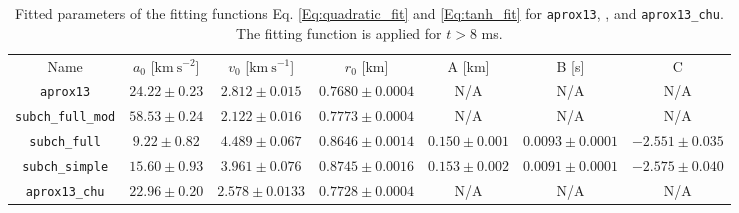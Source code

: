 \documentclass[preprint,times,tighten,linenumbers,trackchanges]{aastex631}
\begin{document}
\begin{table*}
\caption{\label{Tab:network_fitted_param}
Fitted parameters of the fitting functions Eq. \ref{Eq:quadratic_fit} and \ref{Eq:tanh_fit} for {\tt aprox13}, , and {\tt aprox13\_chu}. The fitting function is applied for $t > 8$ ms.
}

\begin{ruledtabular}
\footnotesize
\centering
\begin{tabular}{ccccccc}
\small 
Name &
$a_0$ [$\mbox{km} \ \mbox{s}^{-2}$] &
$v_0$ [$\mbox{km} \ \mbox{s}^{-1}$] &
$r_0$ [km] &
A [km]&
B [s]&
C

\\ 
\colrule
{\tt aprox13} & $24.22 \pm 0.23$ & $2.812 \pm 0.015$ & $0.7680\pm 0.0004 $ & N/A & N/A & N/A\\

{\tt subch\_full\_mod} & $58.53 \pm 0.24$ & $2.122 \pm 0.016$ & $0.7773 \pm 0.0004$ & N/A & N/A & N/A\\

{\tt subch\_full} & $9.22 \pm 0.82$ & $4.489 \pm 0.067$ & $0.8646 \pm 0.0014$ & $0.150 \pm 0.001$ & $0.0093 \pm 0.0001$ & $-2.551 \pm 0.035$ \\

{\tt subch\_simple} & $15.60 \pm 0.93$ & $3.961 \pm 0.076$ & $0.8745 \pm 0.0016$ & $0.153 \pm 0.002$ & $0.0091 \pm 0.0001$ & $-2.575 \pm 0.040$\\
 
{\tt aprox13\_chu} & $22.96 \pm 0.20$ & $2.578 \pm 0.0133$ & $0.7728 \pm 0.0004$ & N/A & N/A & N/A\\
 


\end{tabular}
\end{ruledtabular}
\end{table*}
\end{document}
